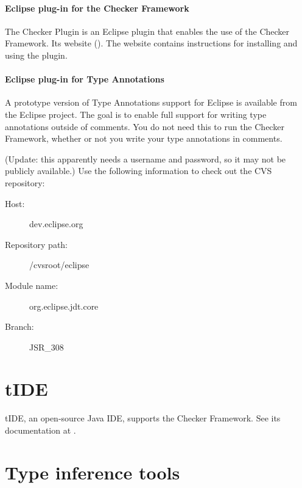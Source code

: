 \paragraph{Eclipse plug-in for the Checker Framework}

The Checker Plugin is an Eclipse plugin that enables the use of the Checker
Framework.
Its website ().
The website contains instructions for installing and using the plugin.

\paragraph{Eclipse plug-in for Type Annotations}

A prototype version of Type Annotations support for Eclipse is
available from the Eclipse project.  The goal is to enable full support for
writing
type annotations outside of comments.  You do not need this to run the
Checker Framework, whether or not you write your type annotations in comments.

(Update:  this apparently needs a username and password, so it may not be
publicly available.)
Use the following information to check
out the CVS repository:
\begin{description}
\item[Host:]                 dev.eclipse.org
\item[Repository path:] /cvsroot/eclipse
\item[Module name:]    org.eclipse.jdt.core
\item[Branch:]             JSR\_308
\end{description}


\section{tIDE\label{tide}}

tIDE, an open-source Java IDE, supports the Checker Framework.  See its
documentation at .


\section{Type inference tools\label{type-inference-tools}}

